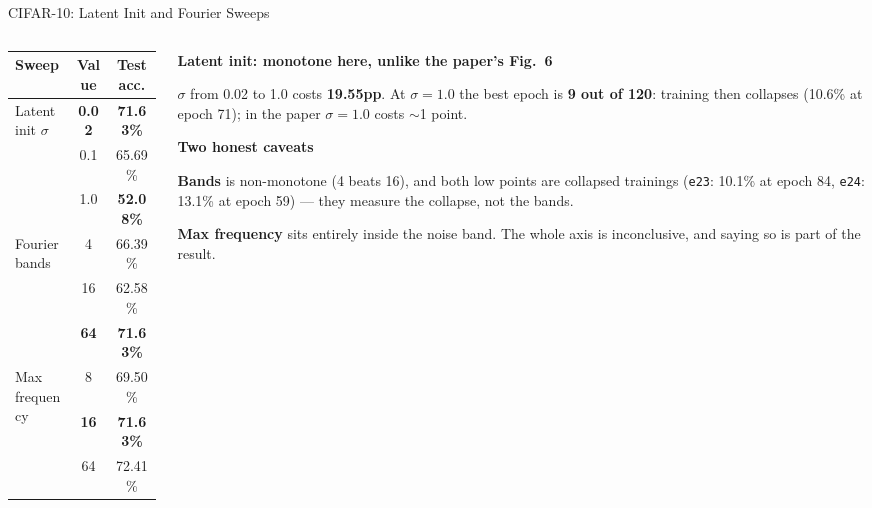 \documentclass[aspectratio=169,11pt]{beamer}
\newcommand{\colhead}[1]{{\color{HeadBlue}\bfseries #1}\par\vspace{0.25em}}
\newcommand{\alerthead}[1]{{\color{AccentRed}\bfseries #1}\par\vspace{0.25em}}
\begin{document}
\begin{frame}[shrink=5]{CIFAR-10: Latent Init and Fourier Sweeps}
  \begin{columns}[T]
    \begin{column}{0.50\textwidth}
      \begin{table}
        \centering\small
        \begin{tabular}{lcc}
          \toprule
          \textbf{Sweep} & \textbf{Value} & \textbf{Test acc.} \\
          \midrule
          \multirow{3}{*}{Latent init $\sigma$}
            & \textbf{0.02} & \textbf{71.63\%} \\
            & 0.1 & \textcolor{AccentOrange}{65.69\%} \\
            & 1.0 & \textcolor{AccentRed}{\textbf{52.08\%}} \\
          \midrule
          \multirow{3}{*}{Fourier bands}
            & 4 & 66.39\% \\
            & 16 & 62.58\% \\
            & \textbf{64} & \textbf{71.63\%} \\
          \midrule
          \multirow{3}{*}{Max frequency}
            & 8 & 69.50\% \\
            & \textbf{16} & \textbf{71.63\%} \\
            & 64 & 72.41\% \\
          \bottomrule
        \end{tabular}
      \end{table}
    \end{column}
    \begin{column}{0.46\textwidth}
      \alerthead{Latent init: monotone here, unlike the paper's Fig.~6}
        \small
        $\sigma$ from 0.02 to 1.0 costs \textbf{19.55pp}. At $\sigma=1.0$ the best epoch is \textbf{9 out of 120}: training then collapses (10.6\% at epoch 71); in the paper $\sigma=1.0$ costs $\sim$1 point.
      

      \vspace{0.3em}
      \colhead{Two honest caveats}
        \scriptsize
        \textbf{Bands} is non-monotone (4 beats 16), and both low points are collapsed trainings (\texttt{e23}: 10.1\% at epoch 84, \texttt{e24}: 13.1\% at epoch 59) --- they measure the collapse, not the bands.

        \vspace{0.3em}
        \textbf{Max frequency} sits entirely inside the noise band. The whole axis is inconclusive, and saying so is part of the result.
      
    \end{column}
  \end{columns}
\end{frame}
\end{document}
